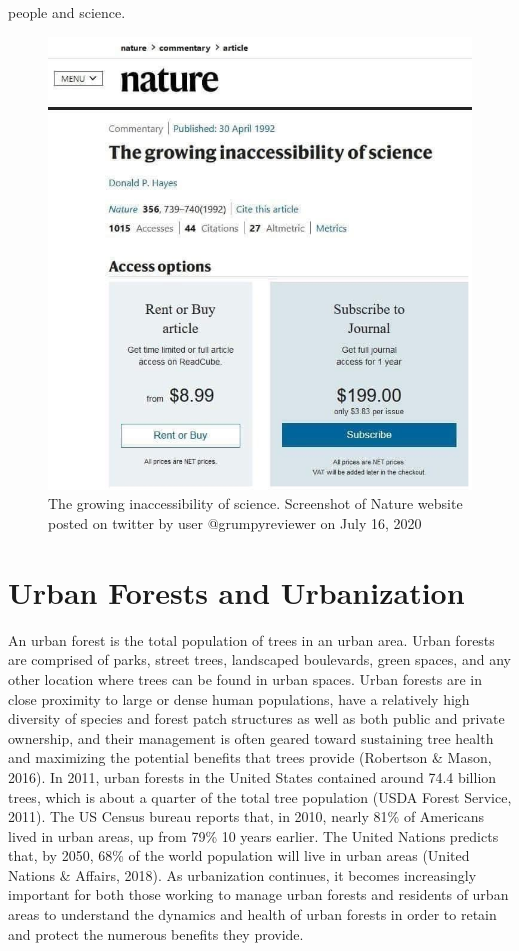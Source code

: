 \documentclass[12pt,twoside]{reedthesis}
\begin{document}
people and science.
\begin{figure}

{\centering \includegraphics[width=0.75\linewidth]{figure/science_inaccessable} 

}

\caption[The growing inaccessibility of science]{The growing inaccessibility of science. Screenshot of Nature website posted on twitter by user @grumpyreviewer on July 16, 2020}\label{fig:twitter-pic}
\end{figure}
\hypertarget{urban-forests-and-urbanization}{%
\section{Urban Forests and Urbanization}\label{urban-forests-and-urbanization}}

An urban forest is the total population of trees in an urban area. Urban
forests are comprised of parks, street trees, landscaped boulevards,
green spaces, and any other location where trees can be found in urban
spaces. Urban forests are in close proximity to large or dense human
populations, have a relatively high diversity of species and forest
patch structures as well as both public and private ownership, and their
management is often geared toward sustaining tree health and maximizing
the potential benefits that trees provide (Robertson \& Mason, 2016). In 2011,
urban forests in the United States contained around 74.4 billion trees,
which is about a quarter of the total tree population
(USDA Forest Service, 2011). The US Census bureau reports that, in 2010,
nearly 81\% of Americans lived in urban areas, up from 79\% 10 years
earlier. The United Nations predicts that, by 2050, 68\% of the world
population will live in urban areas (United Nations \& Affairs, 2018). As
urbanization continues, it becomes increasingly important for both those
working to manage urban forests and residents of urban areas to
understand the dynamics and health of urban forests in order to retain
and protect the numerous benefits they provide.
\end{document}
